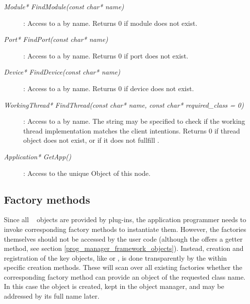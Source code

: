\begin{description}

\item[\em Module* FindModule\small (const char* name)] :
Access to a  by name. Returns $0$ if module does not exist.
   
\item[\em Port* FindPort\small (const char* name)]:
Access to a  by name. Returns $0$ if port does not exist.
 
\item[\em Device* FindDevice\small (const char* name)] :
Access to a  by name. Returns $0$ if device does not exist.


\item[\em WorkingThread* FindThread\small (const char* name, const char* required\_class = 0)] :
Access to a  by name. The  string may
be specified to check if the working thread implementation matches the client
intentions. Returns $0$ if thread object does not exist, or if it does not fullfill
.


\item[\em Application* GetApp()] : 
Access to the unique  Object of this node.


	 
\end{description}

\subsection{Factory methods}	 
Since all \dabc~ objects are provided by   plug-ins,
the application programmer needs to invoke corresponding factory methods to
instantiate them. However, the factories themselves should not be accessed by the
user code (although the  offers a getter method, see section
\ref{prog_manager_framework_objects}). Instead, creation and registration
of the key objects, like  or , 
is done transparently by the  
within specific creation methods. These will scan over all existing factories 
whether the corresponding factory method can provide an object of the requested class name.
In this case the object is created, kept in the object manager, and may be
addressed by its full name later.



